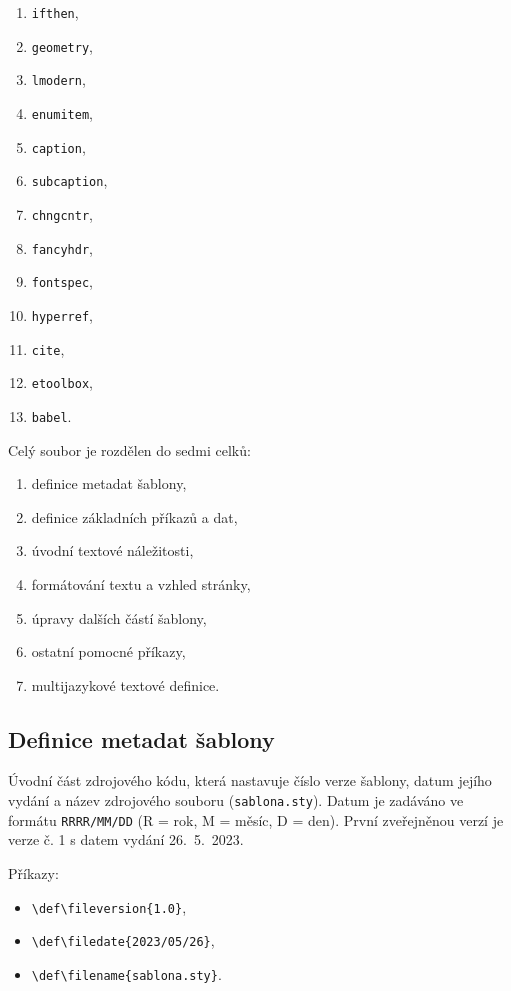 \begin{multicols}{2}
	\begin{enumerate}
		\item \verb|ifthen|,
		\item \verb|geometry|,
		\item \verb|lmodern|,
		\item \verb|enumitem|,
		\item \verb|caption|,
		\item \verb|subcaption|,
		\item \verb|chngcntr|,
	\columnbreak
		\item \verb|fancyhdr|,
		\item \verb|fontspec|,
		\item \verb|hyperref|,
		\item \verb|cite|,
		\item \verb|etoolbox|,
		\item \verb|babel|.
	\end{enumerate}
\end{multicols}

Celý soubor je rozdělen do sedmi celků:

\begin{enumerate}
	\item definice metadat šablony,
	\item definice základních příkazů a dat,
	\item úvodní textové náležitosti,
	\item formátování textu a vzhled stránky,
	\item úpravy dalších částí šablony,
	\item ostatní pomocné příkazy,
	\item multijazykové textové definice.
\end{enumerate}



\subsection{Definice metadat šablony}
Úvodní část zdrojového kódu, která nastavuje číslo verze šablony, datum jejího vydání a název zdrojového souboru (\verb|sablona.sty|). Datum je zadáváno ve formátu \verb|RRRR/MM/DD| (R = rok, M = měsíc, D = den). První zveřejněnou verzí je verze č. 1 s datem vydání 26.~5.~2023. 

Příkazy:

\begin{itemize}[label={-}]
	\item \verb|\def\fileversion{1.0}|,
	\item \verb|\def\filedate{2023/05/26}|,
	\item \verb|\def\filename{sablona.sty}|.
\end{itemize}

